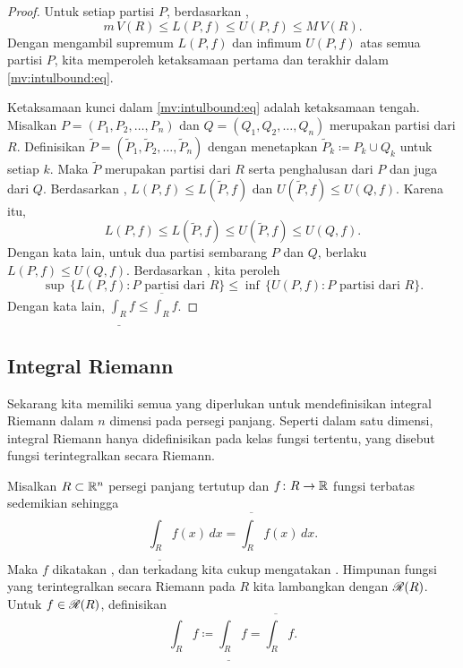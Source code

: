 \begin{proof}
Untuk setiap partisi $P$, berdasarkan ,
\begin{equation*}
m\,V(R) \leq L(P,f) \leq U(P,f) \leq M\,V(R).
\end{equation*}
Dengan mengambil supremum $L(P,f)$ dan infimum $U(P,f)$ atas semua partisi $P$,
kita memperoleh ketaksamaan pertama dan terakhir dalam
\eqref{mv:intulbound:eq}.

Ketaksamaan kunci dalam \eqref{mv:intulbound:eq} adalah ketaksamaan tengah.
Misalkan $P=(P_1,P_2,\ldots,P_n)$ dan
$Q=(Q_1,Q_2,\ldots,Q_n)$ merupakan partisi dari $R$. Definisikan
$\widetilde{P} = ( \widetilde{P}_1,\widetilde{P}_2,\ldots,\widetilde{P}_n )$
dengan menetapkan $\widetilde{P}_k \coloneqq P_k \cup Q_k$ untuk setiap $k$.
Maka $\widetilde{P}$ merupakan partisi dari $R$ serta penghalusan dari $P$ dan
juga dari $Q$. Berdasarkan ,
$L(P,f) \leq L(\widetilde{P},f)$ dan
$U(\widetilde{P},f) \leq U(Q,f)$. Karena itu,
\begin{equation*}
L(P,f) \leq L(\widetilde{P},f) \leq U(\widetilde{P},f) \leq U(Q,f) .
\end{equation*}
Dengan kata lain, untuk dua partisi sembarang $P$ dan $Q$, berlaku
$L(P,f) \leq U(Q,f)$.
Berdasarkan ,
kita peroleh
\begin{equation*}
\sup \, \bigl\{ L(P,f) : P \text{ partisi dari } R \bigr\}
\leq
\inf \, \bigl\{ U(P,f) : P \text{ partisi dari } R \bigr\} .
\end{equation*}
Dengan kata lain, $\underline{\int_R} f \leq \overline{\int_R} f$.
\end{proof}

\subsection{Integral Riemann}

Sekarang kita memiliki semua yang diperlukan untuk mendefinisikan integral
Riemann dalam $n$ dimensi pada persegi panjang. Seperti dalam satu dimensi,
integral Riemann hanya didefinisikan pada kelas fungsi tertentu, yang disebut
fungsi terintegralkan secara Riemann.

\begin{defn}
Misalkan $R \subset {\mathbb{R}}^n$ persegi panjang tertutup dan
$f \colon R \to {\mathbb{R}}$ fungsi terbatas sedemikian sehingga
\begin{equation*}
\underline{\int_R} f(x)\,dx = \overline{\int_R} f(x)\,dx .
\end{equation*}
Maka $f$ dikatakan \emph{}, dan terkadang
kita cukup mengatakan \emph{}. Himpunan fungsi yang
terintegralkan secara Riemann pada $R$ kita lambangkan dengan
${\mathscr{R}}(R)$.
Untuk $f \in {\mathscr{R}}(R)$, definisikan \emph{}
\begin{equation*}
\int_R f \coloneqq 
\underline{\int_R} f = \overline{\int_R} f .
\end{equation*}
\end{defn}

